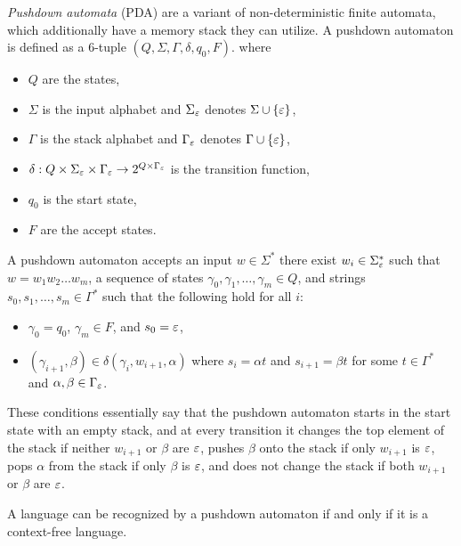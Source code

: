 \begin{defn}
    \emph{Pushdown automata} (PDA) are a variant of non-deterministic finite automata, which additionally have a memory stack they can utilize. A pushdown automaton is defined as a $6$-tuple $(Q, \Sigma, \Gamma, \delta, q_0, F)$. where
    \begin{itemize}
        \item $Q$ are the states,
        \item $\Sigma$ is the input alphabet and $\Sigma_{\varepsilon}$ denotes $\Sigma \cup \{\varepsilon\}$,
        \item $\Gamma$ is the stack alphabet and $\Gamma_{\varepsilon}$ denotes $\Gamma \cup \{\varepsilon\}$,
        \item $\delta: Q \times \Sigma_{\varepsilon} \times \Gamma_{\varepsilon} \to 2^{Q \times \Gamma_{\varepsilon}}$ is the transition function,
        \item $q_0$ is the start state,
        \item $F$ are the accept states.
    \end{itemize}

    A pushdown automaton accepts an input $w \in \Sigma^{*}$ there exist $w_i \in \Sigma_{\varepsilon}^{*}$ such that $w = w_1w_2\ldots w_m$, a sequence of states $\gamma_0, \gamma_1, \ldots, \gamma_m \in Q$, and strings $s_0, s_1, \ldots, s_m \in \Gamma^{*}$ such that the following hold for all $i$:
    \begin{itemize}
        \item $\gamma_0 = q_0$, $\gamma_m \in F$, and $s_0 = \varepsilon$,
        \item $\left(\gamma_{i+1}, \beta\right) \in \delta(\gamma_{i}, w_{i+1}, \alpha)$ where $s_i = \alpha t$ and $s_{i+1} = \beta t$ for some $t \in \Gamma^{*}$ and $\alpha, \beta \in \Gamma_{\varepsilon}$.
    \end{itemize}
    These conditions essentially say that the pushdown automaton starts in the start state with an empty stack, and at every transition it changes the top element of the stack if neither $w_{i+1}$ or $\beta$ are $\varepsilon$, pushes $\beta$ onto the stack if only $w_{i+1}$ is $\varepsilon$, pops $\alpha$ from the stack if only $\beta$ is $\varepsilon$, and does not change the stack if both $w_{i+1}$ or $\beta$ are $\varepsilon$.
\end{defn}

\begin{thm}
    A language can be recognized by a pushdown automaton if and only if it is a context-free language.
\end{thm}

